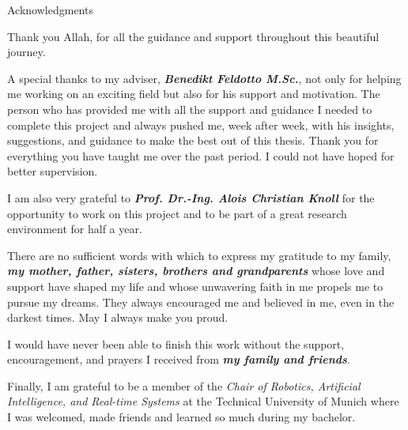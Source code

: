 \thispagestyle{empty}

\vspace*{10mm}

\begin{center}
{ Acknowledgments}
\end{center}

\vspace{5mm}

\begin{center}
Thank you Allah, for all the guidance and support throughout this beautiful journey.
\end{center} 


A special thanks to my adviser, \textit{\textbf{Benedikt Feldotto M.Sc.}}, not only for helping me working on an exciting field but also for his support and motivation. The person who has provided me with all the support and guidance I needed to complete this project and always pushed me, week after week, with his insights, suggestions, and guidance to make the best out of this thesis. Thank you for everything you have taught me over the past period. I could not have hoped for better supervision.

I am also very grateful to \textit{\textbf{Prof. Dr.-Ing. Alois Christian Knoll}} for the opportunity to work on this project and to be part of a great research environment for half a year.

There are no sufficient words with which to express my gratitude to my family, \textit{\textbf{my mother, father, sisters, brothers and grandparents}} whose love and support have shaped my life and whose unwavering faith in me propels me to pursue my dreams. They always encouraged me and believed in me, even in the darkest times. May I always make you proud.

I would have never been able to finish this work without the support, encouragement, and prayers I received from \textit{\textbf{my family and friends}}.

Finally, I am grateful to be a member of the \textit{Chair of Robotics, Artificial Intelligence, and Real-time Systems} at the Technical University of Munich where I was welcomed, made friends and learned so much during my bachelor.